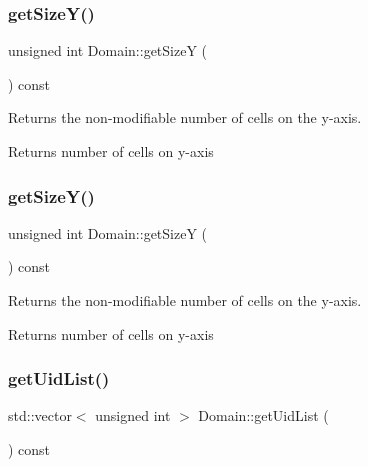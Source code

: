 \subsubsection{\texorpdfstring{get\+Size\+Y()}{getSizeY()}\hspace{0.1cm}{\footnotesize\ttfamily [1/2]}}
{\footnotesize\ttfamily unsigned int Domain\+::get\+SizeY (\begin{DoxyParamCaption}{ }\end{DoxyParamCaption}) const}



Returns the non-\/modifiable number of cells on the y-\/axis. 

\begin{DoxyReturn}{Returns}
number of cells on y-\/axis 
\end{DoxyReturn}
\mbox{\label{classDomain_a66692b4f23353c9b1fe884e583770cb3}} 
\subsubsection{\texorpdfstring{get\+Size\+Y()}{getSizeY()}\hspace{0.1cm}{\footnotesize\ttfamily [2/2]}}
{\footnotesize\ttfamily unsigned int Domain\+::get\+SizeY (\begin{DoxyParamCaption}{ }\end{DoxyParamCaption}) const}



Returns the non-\/modifiable number of cells on the y-\/axis. 

\begin{DoxyReturn}{Returns}
number of cells on y-\/axis 
\end{DoxyReturn}
\mbox{\label{classDomain_a6f7d5f16ca53367feabc00b9efa05be8}} 
\subsubsection{\texorpdfstring{get\+Uid\+List()}{getUidList()}}
{\footnotesize\ttfamily std\+::vector$<$ unsigned int $>$ Domain\+::get\+Uid\+List (\begin{DoxyParamCaption}{ }\end{DoxyParamCaption}) const}



